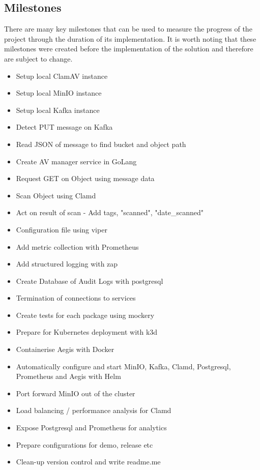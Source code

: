 \documentclass[12pt, conference, final, a4paper, onecolumn, compsoc]{IEEEtran}
\begin{document}
\subsection*{Milestones} %

There are many key milestones that can be used to measure the progress of the
project through the duration of its implementation. It is worth noting that
these milestones were created before the implementation of the solution and
therefore are subject to change.

\begin{itemize}
  \item Setup local ClamAV instance
  \item Setup local MinIO instance
  \item Setup local Kafka instance
  \item Detect PUT message on Kafka
  \item Read JSON of message to find bucket and object path
  \item Create AV manager service in GoLang
  \item Request GET on Object using message data
  \item Scan Object using Clamd
  \item Act on result of scan - Add tags, "scanned", "date\_scanned"
  \item Configuration file using viper
  \item Add metric collection with Prometheus
  \item Add structured logging with zap
  \item Create Database of Audit Logs with postgresql
  \item Termination of connections to services
  \item Create tests for each package using mockery

  \item Prepare for Kubernetes deployment with k3d
  \item Containerise Aegis with Docker
  \item Automatically configure and start MinIO, Kafka, Clamd, Postgresql,
        Prometheus and Aegis with Helm
  \item Port forward MinIO out of the cluster
  \item Load balancing / performance analysis for Clamd
  \item Expose Postgresql and Prometheus for analytics
  \item Prepare configurations for demo, release etc
  \item Clean-up version control and write readme.me
\end{itemize}
\end{document}
